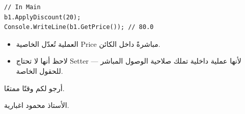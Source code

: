 \documentclass[14pt]{extarticle}
\begin{document}
\begin{boxExample}
\begin{english}
\begin{verbatim}
// In Main
b1.ApplyDiscount(20);
Console.WriteLine(b1.GetPrice()); // 80.0
\end{verbatim}
\end{english}
\end{boxExample}

\begin{itemize}[itemsep=1pt]
    \item العملية تُعدّل الخاصية \textenglish{Price} مباشرةً داخل الكائن.
    \item لاحظ أنها لا تحتاج \textenglish{Setter} — لأنها عملية داخلية تملك صلاحية الوصول المباشر للحقول الخاصة.
\end{itemize}

\vspace{1em}
\begin{flushleft}
أرجو لكم وقتًا ممتعًا.

الأستاذ محمود اغبارية.
\end{flushleft}
\end{document}
